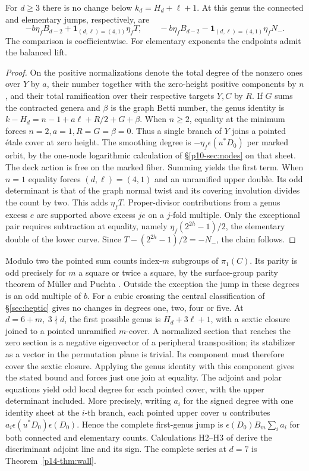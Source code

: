 \begin{proposition}
For \(d\ge3\) there is no change below \(k_d=H_d+\ell+1\). At this genus the connected and elementary jumps, respectively, are
\[
 -b\eta_f B_{d-2}+\mathbf1_{(d,\ell)=(4,1)}\eta_f T,\qquad
 -b\eta_f B_{d-2}-\mathbf1_{(d,\ell)=(4,1)}\eta_f N_- .
\]
The comparison is coefficientwise. For elementary exponents the endpoints admit the balanced lift.
\end{proposition}
\begin{proof}
On the positive normalizations denote the total degree of the nonzero ones over \(Y\) by \(a\), their number together with the zero-height positive components by \(n\), and their total ramification over their respective targets \(Y,C\) by \(R\). If \(G\) sums the contracted genera and \(\beta\) is the graph Betti number, the genus identity is \(k-H_d=n-1+a\ell+R/2+G+\beta\). When \(n\ge2\), equality at the minimum forces \(n=2,a=1,R=G=\beta=0\). Thus a single branch of \(Y\) joins a pointed étale cover at zero height. The smoothing degree is \(-\eta_f\epsilon(u^*D_0)\) per marked orbit, by the one-node logarithmic calculation of \S\ref{p10-sec:nodes} on that sheet. The deck action is free on the marked fiber. Summing yields the first term. When \(n=1\) equality forces \((d,\ell)=(4,1)\) and an unramified upper double. Its odd determinant is that of the graph normal twist and its covering involution divides the count by two. This adds \(\eta_f T\). Proper-divisor contributions from a genus excess \(e\) are supported above excess \(je\) on a \(j\)-fold multiple. Only the exceptional pair requires subtraction at equality, namely \(\eta_f(2^{2h}-1)/2\), the elementary double of the lower curve. Since \(T-(2^{2h}-1)/2=-N_-\), the claim follows.
\end{proof}

Modulo two the pointed sum counts index-\(m\) subgroups of \(\pi_1(C)\). Its parity is odd precisely for \(m\) a square or twice a square, by the surface-group parity theorem of M\"uller and Puchta \cite[Theorem~1]{mp}. Outside the exception the jump in these degrees is an odd multiple of \(b\). For a cubic crossing the central classification of \S\ref{sec:heptic} gives no changes in degrees one, two, four or five. At \(d=6+m,\ 3\nmid d\), the first possible genus is \(H_d+3\ell+1\), with a sextic closure joined to a pointed unramified \(m\)-cover. A normalized section that reaches the zero section is a negative eigenvector of a peripheral transposition; its stabilizer as a vector in the permutation plane is trivial. Its component must therefore cover the sextic closure. Applying the genus identity with this component gives the stated bound and forces just one join at equality. The adjoint and polar equations yield odd local degree for each pointed cover, with the upper determinant included. More precisely, writing \(a_i\) for the signed degree with one identity sheet at the \(i\)-th branch, each pointed upper cover \(u\) contributes \(a_i\epsilon(u^*D_0)\epsilon(D_0)\). Hence the complete first-genus jump is \(\epsilon(D_0)B_m\sum_i a_i\) for both connected and elementary counts. Calculations H2--H3 of \cite{WueSupplement} derive the discriminant adjoint line and its sign. The complete series at \(d=7\) is Theorem~\ref{p14-thm:wall}.

